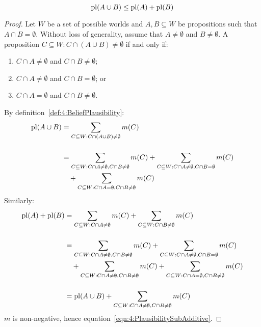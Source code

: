 \begin{thm}
  \begin{equation}
    \label{eqn:4:PlausibilitySubAdditive}
    \operatorname*{pl}(A \cup B) \leq \operatorname*{pl}(A) + \operatorname*{pl}(B)
  \end{equation}

  \begin{proof}
    Let $W$ be a set of possible worlds and $A, B \subseteq W$ be propositions such
    that $A \cap B = \emptyset$.
    Without loss of generality, assume that $A \neq \emptyset$ and $B \neq
      \emptyset$.
    A proposition $C \subseteq W : C \cap (A \cup B) \neq \emptyset$ if and only
    if:
    \begin{enumerate}
      \item $C \cap A \neq \emptyset$ and $C \cap B \neq \emptyset$;
      \item $C \cap A \neq \emptyset$ and $C \cap B = \emptyset$; or
      \item $C \cap A = \emptyset$ and $C \cap B \neq \emptyset$.
    \end{enumerate}
    By definition~\ref{def:4:BeliefPlausibility}:
    \begin{align*}
      \operatorname*{pl}(A \cup B)
       & = \sum_{C \subseteq W : C \cap (A \cup B) \neq \emptyset} m(C)
      \\[3ex]
       & = \sum_{C \subseteq W : C \cap A \neq \emptyset, C \cap B \neq \emptyset} m(C)
      + \sum_{C \subseteq W : C \cap A \neq \emptyset, C \cap B = \emptyset} m(C)
      \\
       & \quad + \sum_{C \subseteq W : C \cap A = \emptyset, C \cap B \neq \emptyset} m(C)
    \end{align*}
    Similarly:
    \begin{align*}
      \operatorname*{pl}(A) + \operatorname*{pl}(B)
       & =
      \sum_{C \subseteq W : C \cap A \neq \emptyset} m(C) +
      \sum_{C \subseteq W : C \cap B \neq \emptyset} m(C)
      \\[3ex]
       & =
      \sum_{C \subseteq W : C \cap A \neq \emptyset, C \cap B \neq \emptyset} m(C) +
      \sum_{C \subseteq W : C \cap A \neq \emptyset, C \cap B = \emptyset} m(C)
      \\
       & \quad +
      \sum_{C \subseteq W : C \cap A \neq \emptyset, C \cap B \neq \emptyset} m(C) +
      \sum_{C \subseteq W : C \cap A = \emptyset, C \cap B \neq \emptyset} m(C)
      \\[3ex]
       & =
      \operatorname*{pl}(A \cup B) +
      \sum_{C \subseteq W : C \cap A \neq \emptyset, C \cap B \neq \emptyset} m(C)
    \end{align*}
    $m$ is non-negative, hence equation~\ref{eqn:4:PlausibilitySubAdditive}.
  \end{proof}
\end{thm}

